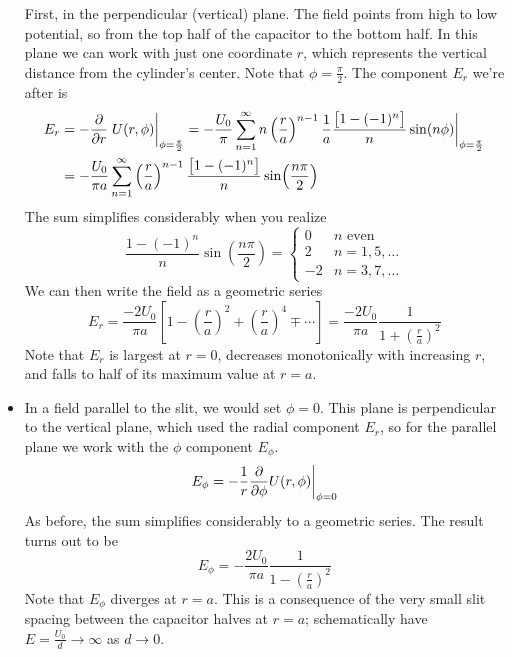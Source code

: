 \documentclass[11pt, a4paper]{article}
\begin{document}
\begin{itemize}
	First, in the perpendicular (vertical) plane. The field points from high to low potential, so from the top half of the capacitor to the bottom half. In this plane we can work with just one coordinate $ r $, which represents the vertical distance from the cylinder's center. Note that $ \phi = \frac{\pi}{2} $. The component $ E_{r} $ we're after is
	\begin{align*}
		E_{r} &= - \pdv{r}\eval{U(r, \phi)}_{\phi = \frac{\pi}{2}}  = - \frac{U_{0}}{\pi} \sum_{n = 1}^{\infty} n\left(\frac{r}{a}\right)^{n -1}\frac{1}{a}\frac{\big[1 - (-1)^{n}\big]}{n}\sin(n\phi)\bigg|_{\phi = \frac{\pi}{2}}\\
		&=  -\frac{U_{0}}{\pi a} \sum_{n= 1}^{\infty}\left(\frac{r}{a}\right)^{n-1} \frac{\big[1 - (-1)^{n}\big]}{n}\sin(\frac{n\pi}{2})
	\end{align*}
	The sum simplifies considerably when you realize
	\begin{equation*}
		\frac{1 - (-1)^{n}}{n}\sin(\frac{n\pi}{2}) = 
		\begin{cases}
			0 & n \text{ even} \\
			2 & n = 1, 5,\ldots \\
			-2 & n = 3, 7,\ldots 
		\end{cases}
	\end{equation*}
	We can then write the field as a geometric series
	\begin{equation*}
		E_{r} = \frac{-2U_{0}}{\pi a}\left[1 - \left(\frac{r}{a}\right)^{2} + \left(\frac{r}{a}\right)^{4} \mp \cdots  \right] = \frac{-2U_{0}}{\pi a} \frac{1}{1 + \left(\frac{r}{a}\right)^{2}}
	\end{equation*}
	Note that $ E_{r} $ is largest at $ r = 0 $, decreases monotonically with increasing $ r $, and falls to half of its maximum value at $ r = a $. 
	
	\item In a field parallel to the slit, we would set $ \phi = 0 $. This plane is perpendicular to the vertical plane, which used the radial component $ E_{r} $, so for the parallel plane we work with the $ \phi $ component $ E_{\phi} $. 
	\begin{equation*}
		E_{\phi} = - \frac{1}{r}\pdv{\phi}U(r, \phi) \bigg |_{\phi = 0}
	\end{equation*}
	As before, the sum simplifies considerably to a geometric series. The result turns out to be
	\begin{equation*}
		E_{\phi} = - \frac{2U_{0}}{\pi a}\frac{1}{1 - \left(\frac{r}{a}\right)^{2}}
	\end{equation*}
	Note that $ E_{\phi} $ diverges at $ r = a $. This is a consequence of the very small slit spacing between the capacitor halves at $ r = a $; schematically have $ E = \frac{U_{0}}{d} \to \infty $ as $ d \to 0 $. 
	
\end{itemize}
\end{document}
